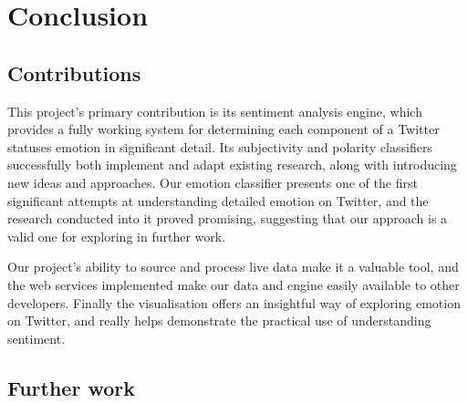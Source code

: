 \chapter{Conclusion}
\label{conclusion}

\section{Contributions}

This project's primary contribution is its sentiment analysis engine, which provides a fully working system for determining each component of a Twitter statuses emotion in significant detail. Its subjectivity and polarity classifiers successfully both implement and adapt existing research, along with introducing new ideas and approaches. Our emotion classifier presents one of the first significant attempts at understanding detailed emotion on Twitter, and the research conducted into it proved promising, suggesting that our approach is a valid one for exploring in further work.

Our project's ability to source and process live data make it a valuable tool, and the web services implemented make our data and engine easily available to other developers. Finally the visualisation offers an insightful way of exploring emotion on Twitter, and really helps demonstrate the practical use of understanding sentiment.

\section{Further work}

